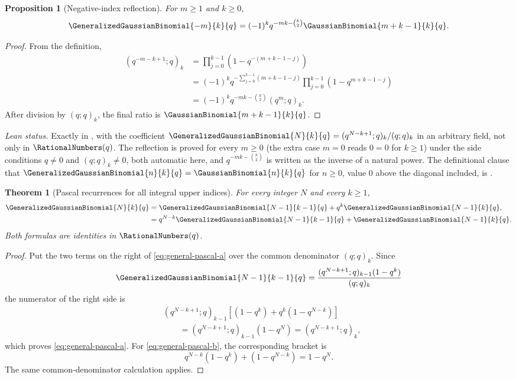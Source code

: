 \documentclass[11pt,a4paper,oneside,openany]{book}
\newtheorem{theorem}{Theorem}[chapter]
\newtheorem{proposition}[proposition]{Proposition}
\theoremstyle{definition}
\theoremstyle{remark}
\begin{document}
\begin{proposition}[Negative-index reflection]\label{prop:negative-gaussian}
For $m\ge1$ and $k\ge0$,
\[
 \GeneralizedGaussianBinomial{-m}{k}{q}
 =(-1)^kq^{-mk-\binom k2}
   \GaussianBinomial{m+k-1}{k}{q}.
 \label{eq:negative-reflection}
\]
\end{proposition}

\begin{proof}
From the definition,
\begin{align*}
 (q^{-m-k+1};q)_k
 &=\prod_{j=0}^{k-1}\left(1-q^{-(m+k-1-j)}\right)\\
 &=(-1)^kq^{-\sum_{j=0}^{k-1}(m+k-1-j)}
   \prod_{j=0}^{k-1}(1-q^{m+k-1-j})\\
 &=(-1)^kq^{-mk-\binom k2}(q^m;q)_k.
\end{align*}
After division by $(q;q)_k$, the final ratio is $\GaussianBinomial{m+k-1}{k}{q}$.
\end{proof}
\emph{Lean status.}  Exactly  in
, with  the coefficient
\(\GeneralizedGaussianBinomial{N}{k}{q}=(q^{N-k+1};q)_k/(q;q)_k\) in an arbitrary field, not
only in \(\RationalNumbers(q)\).  The reflection is proved for every \(m\ge0\) (the extra case
\(m=0\) reads \(0=0\) for \(k\ge1\)) under the side conditions \(q\ne0\) and \((q;q)_k\ne0\), both
automatic here, and \(q^{-mk-\binom k2}\) is written as the inverse of a natural power.  The
definitional clause that \(\GeneralizedGaussianBinomial{n}{k}{q}=\GaussianBinomial{n}{k}{q}\) for
\(n\ge0\), value \(0\) above the diagonal included, is .


\begin{theorem}[Pascal recurrences for all integral upper indices]\label{thm:generalized-pascal}
For every integer $N$ and every $k\ge1$,
\begin{align}
 \GeneralizedGaussianBinomial{N}{k}{q}
 &=\GeneralizedGaussianBinomial{N-1}{k-1}{q}
   +q^k\GeneralizedGaussianBinomial{N-1}{k}{q},
 \label{eq:general-pascal-a}\\
 &=q^{N-k}\GeneralizedGaussianBinomial{N-1}{k-1}{q}
   +\GeneralizedGaussianBinomial{N-1}{k}{q}.
 \label{eq:general-pascal-b}
\end{align}
Both formulas are identities in $\RationalNumbers(q)$.
\end{theorem}

\begin{proof}
Put the two terms on the right of \eqref{eq:general-pascal-a} over the common denominator $(q;q)_k$.  Since
\[
 \GeneralizedGaussianBinomial{N-1}{k-1}{q}
 =\frac{(q^{N-k+1};q)_{k-1}(1-q^k)}{(q;q)_k}
\]
the numerator of the right side is
\begin{align*}
 &(q^{N-k+1};q)_{k-1}
 \left[(1-q^k)+q^k(1-q^{N-k})\right]\\
 &\qquad=(q^{N-k+1};q)_{k-1}(1-q^N)
 =(q^{N-k+1};q)_k,
\end{align*}
which proves \eqref{eq:general-pascal-a}.  For \eqref{eq:general-pascal-b}, the corresponding bracket is
\[
 q^{N-k}(1-q^k)+(1-q^{N-k})=1-q^N.
\]
The same common-denominator calculation applies.
\end{proof}
\end{document}
